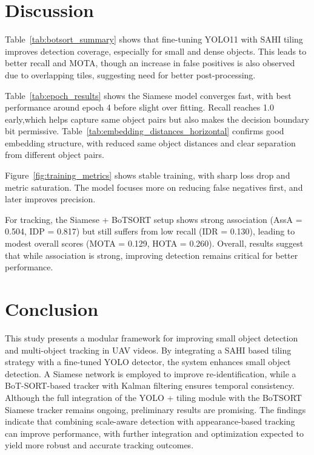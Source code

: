 \documentclass[conference]{IEEEtran}
\begin{document}
\section{Discussion}
\label{sec:discussion}

Table~\ref{tab:botsort_summary} shows that fine-tuning YOLO11 with SAHI tiling improves detection coverage, especially for small and dense objects. This leads to better recall and MOTA, though an increase in false positives is also observed due to overlapping tiles,  suggesting need for better post-processing.

Table~\ref{tab:epoch_results} shows the Siamese model converges fast, with best performance around epoch 4 before slight over fitting. Recall reaches 1.0 early,which helps capture same object pairs but also makes the decision boundary bit permissive. Table~\ref{tab:embedding_distances_horizontal} confirms good embedding structure, with reduced same object distances and clear separation from different object pairs.

Figure~\ref{fig:training_metrics} shows stable training, with sharp loss drop and metric saturation. The model focuses more on reducing false negatives first, and later improves precision.

For tracking, the Siamese + BoTSORT setup shows strong association (AssA = 0.504, IDP = 0.817) but still suffers from low recall (IDR = 0.130), leading to modest overall scores (MOTA = 0.129, HOTA = 0.260). Overall, results suggest that while association is strong, improving detection remains critical for better performance.

\section{Conclusion}
\label{sec:conclusion}

This study presents a modular framework for improving small object detection and multi-object tracking in UAV videos. By integrating a SAHI based tiling strategy with a fine-tuned YOLO detector, the system enhances small object detection. A Siamese network is employed  to improve re-identification, while a BoT-SORT-based tracker with Kalman filtering ensures temporal consistency. Although the full integration of the YOLO + tiling module with the BoTSORT Siamese tracker remains ongoing, preliminary results are promising. The findings indicate that combining scale-aware detection with appearance-based tracking can improve performance, with further integration and optimization expected to yield more robust and accurate tracking outcomes.
\end{document}
